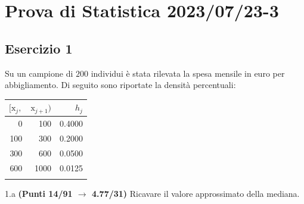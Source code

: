 \documentclass[
  11pt,
]{book}
\theoremstyle{mytheoremstyle}
\theoremstyle{mydefstyle}
\begin{document}
\section{Prova di Statistica 2023/07/23-3}\label{prova-di-statistica-20230723-3}

\subsection{Esercizio 1}\label{esercizio-1-34}

Su un campione di \(200\) individui è stata rilevata la spesa mensile in euro per abbigliamento. Di seguito sono riportate la densità percentuali:

\begin{table}[H]
\centering
\begin{tabular}{rrr}
\toprule
$[\text{x}_j,$ & $\text{x}_{j+1})$ & $h_j$\\
\midrule
0 & 100 & 0.4000\\
100 & 300 & 0.2000\\
300 & 600 & 0.0500\\
600 & 1000 & 0.0125\\
 &  & \\
\bottomrule
\end{tabular}
\end{table}

1.a \textbf{(Punti 14/91 \(\rightarrow\) 4.77/31)} Ricavare il valore approssimato della mediana.
\end{document}
